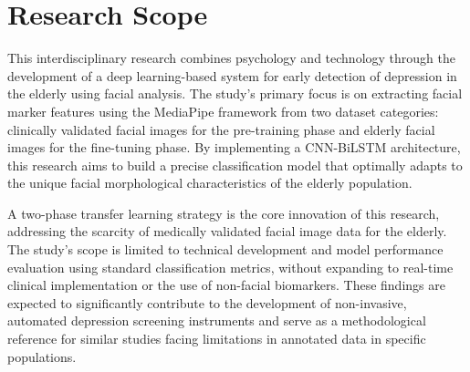 \section{Research Scope}

This interdisciplinary research combines psychology and technology through the development of a deep learning-based system for early detection of depression in the elderly using facial analysis. The study's primary focus is on extracting facial marker features using the MediaPipe framework from two dataset categories: clinically validated facial images for the pre-training phase and elderly facial images for the fine-tuning phase. By implementing a CNN-BiLSTM architecture, this research aims to build a precise classification model that optimally adapts to the unique facial morphological characteristics of the elderly population.

A two-phase transfer learning strategy is the core innovation of this research, addressing the scarcity of medically validated facial image data for the elderly. The study's scope is limited to technical development and model performance evaluation using standard classification metrics, without expanding to real-time clinical implementation or the use of non-facial biomarkers. These findings are expected to significantly contribute to the development of non-invasive, automated depression screening instruments and serve as a methodological reference for similar studies facing limitations in annotated data in specific populations.








